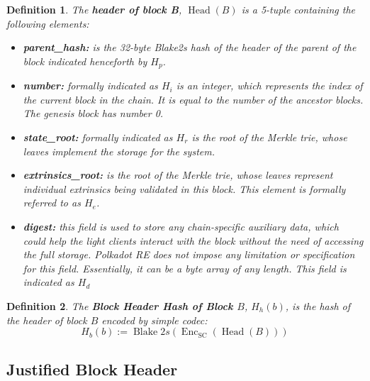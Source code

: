 \documentclass{article}
\newcommand{\assign}{:=}
\newcommand{\tmop}[1]{\ensuremath{\operatorname{#1}}}
\newcommand{\tmsamp}[1]{\textsf{#1}}
\newcommand{\tmstrong}[1]{\textbf{#1}}
\newcommand{\tmtextbf}[1]{{\bfseries{#1}}}
\newcommand{\tmtextsf}[1]{{\sffamily{#1}}}
\newtheorem{definition}{Definition}
\providecommand{\tmop}[1]{\ensuremath{\mathrm{#1}}}
\providecommand{\tmsamp}[1]{\tmtextsf{#1}}
\providecommand{\tmstrong}[1]{\tmtextbf{#1}}
\providecommand{\tmtextbf}[1]{\tmtextbf{#1}}
\newtheorem{definition}{Definition}
\begin{document}
\begin{definition}
  \label{def-block-header}The {\tmstrong{header of block B}},
  {\tmstrong{$\tmop{Head} (B)$}} is a 5-tuple containing the following
  elements:
  \begin{itemize}
    \item \tmtextbf{{\tmsamp{parent\_hash:}}} is the 32-byte Blake2s hash of
    the header of the parent of the block indicated henceforth by
    \tmtextbf{$H_p$}.
    
    \item {\tmstrong{{\tmsamp{number:}}}} formally indicated as
    {\tmstrong{$H_i$}} is an integer, which represents the index of the
    current block in the chain. It is equal to the number of the ancestor
    blocks. The genesis block has number 0.
    
    \item {\tmstrong{{\tmsamp{state\_root:}}}} formally indicated as
    {\tmstrong{$H_r$}} is the root of the Merkle trie, whose leaves implement
    the storage for the system.
    
    \item {\tmstrong{{\tmsamp{extrinsics\_root:}}}} is the root of the Merkle
    trie, whose leaves represent individual extrinsics being validated in this
    block. This element is formally referred to as {\tmstrong{$H_e$}}.
    
    \item {\tmstrong{{\tmsamp{digest:}}}} this field is used to store any
    chain-specific auxiliary data, which could help the light clients interact
    with the block without the need of accessing the full storage. Polkadot RE
    does not impose any limitation or specification for this field.
    Essentially, it can be a byte array of any length. This field is indicated
    as {\tmstrong{$H_d$}}
  \end{itemize}
\end{definition}

\begin{definition}
  \label{def-block-header-hash}The {\tmstrong{Block Header Hash of Block
  $B$}}, {\tmstrong{$H_h (b)$}}, is the hash of the header of block $B$
  encoded by simple codec:
  \[ H_b (b) \assign \tmop{Blake} 2 s (\tmop{Enc}_{\tmop{SC}} (\tmop{Head}
     (B))) \]
\end{definition}

\subsection{Justified Block Header}
\end{document}
